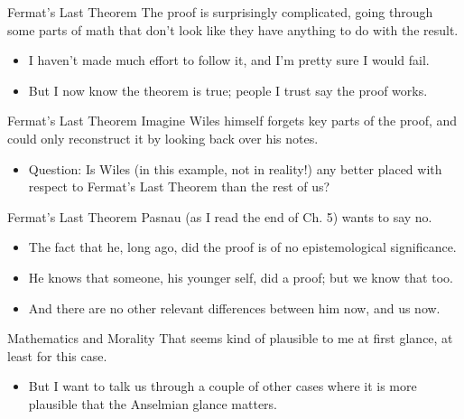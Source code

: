 \documentclass[
  17pt,
  letterpaper,
  ignorenonframetext,
  aspectratio=169,
]{beamer}
\providecommand{\tightlist}{%
  \setlength{\itemsep}{0pt}\setlength{\parskip}{0pt}}\usepackage{longtable,booktabs,array}
\begin{document}
\begin{frame}{Fermat's Last Theorem}
\protect\hypertarget{fermats-last-theorem-1}{}
The proof is surprisingly complicated, going through some parts of math
that don't look like they have anything to do with the result.

\begin{itemize}[<+->]
\tightlist
\item
  I haven't made much effort to follow it, and I'm pretty sure I would
  fail.
\item
  But I now know the theorem is true; people I trust say the proof
  works.
\end{itemize}
\end{frame}

\begin{frame}{Fermat's Last Theorem}
\protect\hypertarget{fermats-last-theorem-2}{}
Imagine Wiles himself forgets key parts of the proof, and could only
reconstruct it by looking back over his notes.

\begin{itemize}[<+->]
\tightlist
\item
  Question: Is Wiles (in this example, not in reality!) any better
  placed with respect to Fermat's Last Theorem than the rest of us?
\end{itemize}
\end{frame}

\begin{frame}{Fermat's Last Theorem}
\protect\hypertarget{fermats-last-theorem-3}{}
Pasnau (as I read the end of Ch. 5) wants to say no.

\begin{itemize}[<+->]
\tightlist
\item
  The fact that he, long ago, did the proof is of no epistemological
  significance.
\item
  He knows that someone, his younger self, did a proof; but we know that
  too.
\item
  And there are no other relevant differences between him now, and us
  now.
\end{itemize}
\end{frame}

\begin{frame}{Mathematics and Morality}
\protect\hypertarget{mathematics-and-morality}{}
That seems kind of plausible to me at first glance, at least for this
case.

\begin{itemize}[<+->]
\tightlist
\item
  But I want to talk us through a couple of other cases where it is more
  plausible that the Anselmian glance matters.
\end{itemize}
\end{frame}
\end{document}

